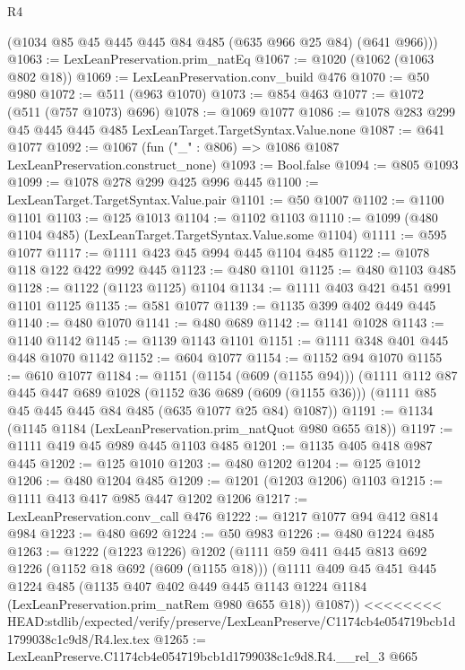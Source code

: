 \begin{lexlean}{R4}
\begin{coremodule}
{{{{{{{{{{{{{{{      (@1034 @85 @45 @445 @445 @84 @485 (@635 @966 @25 @84) (@641 @966)))
@1063 := LexLeanPreservation.prim_natEq
@1067 := @1020 (@1062 (@1063 @802 @18))
@1069 := LexLeanPreservation.conv_build @476
@1070 := @50 @980
@1072 := @511 (@963 @1070)
@1073 := @854 @463
@1077 := @1072 (@511 (@757 @1073) @696)
@1078 := @1069 @1077
@1086 := @1078 @283 @299 @45 @445 @445 @485 LexLeanTarget.TargetSyntax.Value.none
@1087 := @641 @1077
@1092 := @1067 (fun ("_" : @806) => @1086 @1087 LexLeanPreservation.construct_none)
@1093 := Bool.false
@1094 := @805 @1093
@1099 := @1078 @278 @299 @425 @996 @445
@1100 := LexLeanTarget.TargetSyntax.Value.pair
@1101 := @50 @1007
@1102 := @1100 @1101
@1103 := @125 @1013
@1104 := @1102 @1103
@1110 := @1099 (@480 @1104 @485) (LexLeanTarget.TargetSyntax.Value.some @1104)
@1111 := @595 @1077
@1117 := @1111 @423 @45 @994 @445 @1104 @485
@1122 := @1078 @118 @122 @422 @992 @445
@1123 := @480 @1101
@1125 := @480 @1103 @485
@1128 := @1122 (@1123 @1125) @1104
@1134 := @1111 @403 @421 @451 @991 @1101 @1125
@1135 := @581 @1077
@1139 := @1135 @399 @402 @449 @445
@1140 := @480 @1070
@1141 := @480 @689
@1142 := @1141 @1028
@1143 := @1140 @1142
@1145 := @1139 @1143 @1101
@1151 := @1111 @348 @401 @445 @448 @1070 @1142
@1152 := @604 @1077
@1154 := @1152 @94 @1070
@1155 := @610 @1077
@1184 := @1151
    (@1154 (@609 (@1155 @94)))
    (@1111
      @112
      @87
      @445
      @447
      @689
      @1028
      (@1152 @36 @689 (@609 (@1155 @36)))
      (@1111 @85 @45 @445 @445 @84 @485 (@635 @1077 @25 @84) @1087))
@1191 := @1134 (@1145 @1184 (LexLeanPreservation.prim_natQuot @980 @655 @18))
@1197 := @1111 @419 @45 @989 @445 @1103 @485
@1201 := @1135 @405 @418 @987 @445
@1202 := @125 @1010
@1203 := @480 @1202
@1204 := @125 @1012
@1206 := @480 @1204 @485
@1209 := @1201 (@1203 @1206) @1103
@1215 := @1111 @413 @417 @985 @447 @1202 @1206
@1217 := LexLeanPreservation.conv_call @476
@1222 := @1217 @1077 @94 @412 @814 @984
@1223 := @480 @692
@1224 := @50 @983
@1226 := @480 @1224 @485
@1263 := @1222
    (@1223 @1226)
    @1202
    (@1111
      @59
      @411
      @445
      @813
      @692
      @1226
      (@1152 @18 @692 (@609 (@1155 @18)))
      (@1111
        @409
        @45
        @451
        @445
        @1224
        @485
        (@1135
          @407
          @402
          @449
          @445
          @1143
          @1224
          @1184
          (LexLeanPreservation.prim_natRem @980 @655 @18))
        @1087))
<<<<<<<< HEAD:stdlib/expected/verify/preserve/LexLeanPreserve/C1174cb4e054719bcb1d1799038c1c9d8/R4.lex.tex
@1265 := LexLeanPreserve.C1174cb4e054719bcb1d1799038c1c9d8.R4.__rel_3 @665
}}}}}}}}}}}}}}}
\end{coremodule}
\end{lexlean}
